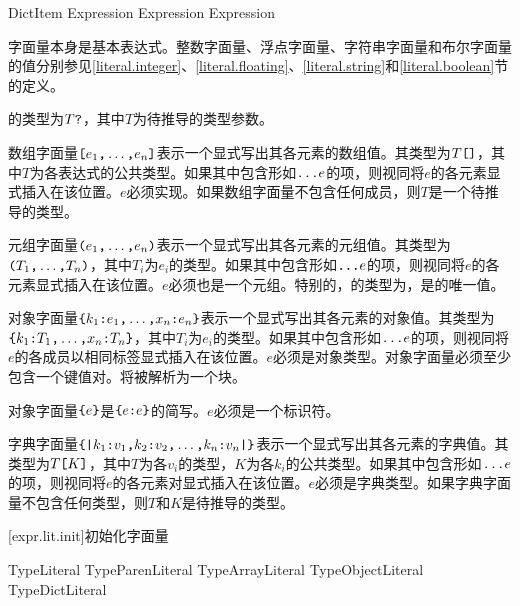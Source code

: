 \begin{bnf}{DictItem}
    Expression \terminal{:} Expression \br
     Expression
\end{bnf}

\pnum
字面量本身是基本表达式。整数字面量、浮点字面量、字符串字面量和布尔字面量的值分别参见\ref{literal.integer}、\ref{literal.floating}、\ref{literal.string}和\ref{literal.boolean}节的定义。

\pnum
{}的类型为$T\texttt{?}$，其中$T$为待推导的类型参数。

\pnum
数组字面量$\texttt{[}e_1\texttt{,}\ldots\texttt{,}e_n\texttt{]}$表示一个显式写出其各元素的数组值。其类型为$T\texttt{[]}$，其中$T$为各表达式的公共类型。如果其中包含形如$\texttt{...}e$的项，则视同将$e$的各元素显式插入在该位置。$e$必须实现。如果数组字面量不包含任何成员，则$T$是一个待推导的类型。

\pnum
元组字面量$\texttt{(}e_1\texttt{,}\ldots\texttt{,}e_n\texttt{)}$表示一个显式写出其各元素的元组值。其类型为$\texttt{(}T_1\texttt{,}\ldots\texttt{,}T_n\texttt{)}$，其中$T_i$为$e_i$的类型。如果其中包含形如$\texttt{...}e$的项，则视同将$e$的各元素显式插入在该位置。$e$必须也是一个元组。特别的，\tcode{()}的类型为，是的唯一值。

\pnum
对象字面量$\texttt{\{}k_1\texttt{:}e_1\texttt{,}\ldots\texttt{,}x_n\texttt{:}e_n\texttt{\}}$表示一个显式写出其各元素的对象值。其类型为$\texttt{\{}k_1\texttt{:}T_1\texttt{,}\ldots\texttt{,}x_n\texttt{:}T_n\texttt{\}}$，其中$T_i$为$e_i$的类型。如果其中包含形如$\texttt{...}e$的项，则视同将$e$的各成员以相同标签显式插入在该位置。$e$必须是对象类型。\enternote 对象字面量必须至少包含一个键值对。\tcode{\{\}}将被解析为一个块。 \exitnote

\pnum
对象字面量$\texttt{\{}e\texttt{\}}$是$\texttt{\{}e\texttt{:}e\texttt{\}}$的简写。$e$必须是一个标识符。

\pnum
字典字面量$\texttt{\{|}k_1\texttt{:} v_1\texttt{,} k_2\texttt{:} v_2\texttt{,} \ldots\texttt{,} k_n\texttt{:} v_n\texttt{|\}}$表示一个显式写出其各元素的字典值。其类型为$T\texttt{[}K\texttt{]}$，其中$T$为各$v_i$的类型，$K$为各$k_i$的公共类型。如果其中包含形如$\texttt{...}e$的项，则视同将$e$的各元素对显式插入在该位置。$e$必须是字典类型。如果字典字面量不包含任何类型，则$T$和$K$是待推导的类型。

[expr.lit.init]{初始化字面量}

\begin{bnf}{TypeLiteral}
    TypeParenLiteral \br
    TypeArrayLiteral \br
    TypeObjectLiteral \br
    TypeDictLiteral
\end{bnf}

